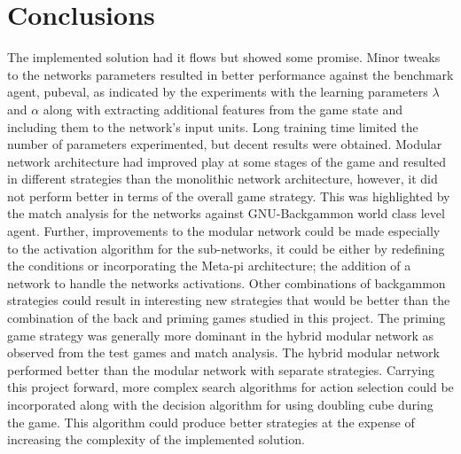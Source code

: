 \documentclass[12pt,a4paper]{article}
\begin{document}
\section{Conclusions}
The implemented solution had it flows but showed some promise. Minor tweaks to the networks parameters resulted in better performance against the benchmark agent, pubeval, as indicated by the experiments with the learning parameters $\lambda$ and $\alpha$ along with extracting additional features from the game state and including them to the network's input units. Long training time limited the number of parameters experimented, but decent results were obtained. Modular network architecture had improved play at some stages of the game and resulted in different strategies than the monolithic network architecture, however, it did not perform better in terms of the overall game strategy. This was highlighted by the match analysis for the networks against GNU-Backgammon world class level agent. Further, improvements to the modular network could be made especially to the activation algorithm for the sub-networks, it could be either by redefining the conditions or incorporating the Meta-pi architecture; the addition of a network to handle the networks activations. Other combinations of backgammon strategies could result in interesting new strategies that would be better than the combination of the back and priming games studied in this project. The priming game strategy was generally more dominant in the hybrid modular network as observed from the test games and match analysis. The hybrid modular network performed better than the modular network with separate strategies. Carrying this project forward, more complex search algorithms for action selection could be incorporated along with the decision algorithm for using doubling cube during the game. This algorithm could produce better strategies at the expense of increasing the complexity of the implemented solution. 


\end{document}
